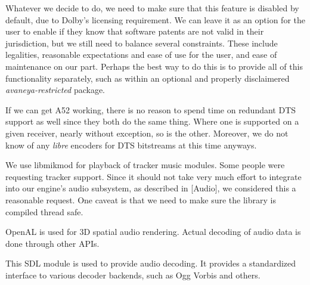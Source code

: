 Whatever we decide to do, we need to make sure that this feature is disabled by default, due to Dolby's licensing requirement. We can leave it as an option for the user to enable if they know that software patents are not valid in their jurisdiction, but we still need to balance several constraints. These include legalities, reasonable expectations and ease of use for the user, and ease of maintenance on our part. Perhaps the best way to do this is to provide all of this functionality separately, such as within an optional and properly disclaimered {\it avaneya-restricted} package.

If we can get A52 working, there is no reason to spend time on redundant DTS support as well since they both do the same thing. Where one is supported on a given receiver, nearly without exception, so is the other. Moreover, we do not know of any {\it libre} encoders for DTS bitstreams at this time anyways.


We use libmikmod for playback of tracker music modules. Some people were requesting tracker support. Since it should not take very much effort to integrate into our engine's audio subsystem, as described in [Audio], we considered this a reasonable request. One caveat is that we need to make sure the library is compiled thread safe.


OpenAL is used for 3D spatial audio rendering. Actual decoding of audio data is done through other APIs.


This SDL module is used to provide audio decoding. It provides a standardized interface to various decoder backends, such as Ogg Vorbis and others.
\stopitemize

